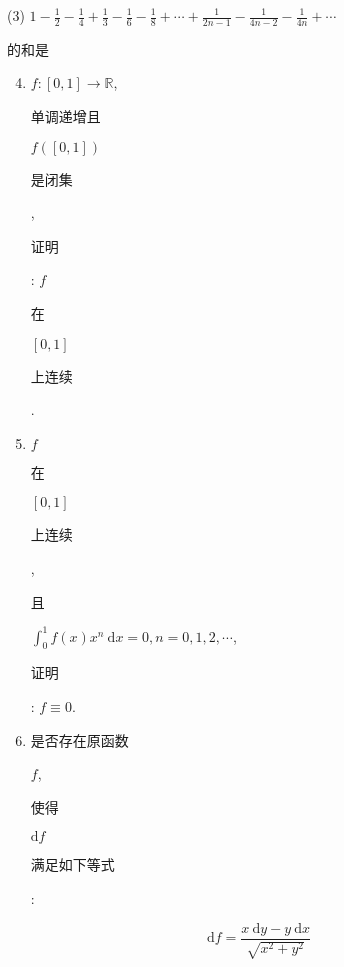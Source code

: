 \documentclass[10pt]{article}
\begin{document}
(3) $1-\frac{1}{2}-\frac{1}{4}+\frac{1}{3}-\frac{1}{6}-\frac{1}{8}+\cdots+\frac{1}{2 n-1}-\frac{1}{4 n-2}-\frac{1}{4 n}+\cdots$ \begin{CJK}{UTF8}{mj}的和是\end{CJK}

\begin{enumerate}
  \setcounter{enumi}{3}
  \item $f:[0,1] \rightarrow \mathbb{R}$, \begin{CJK}{UTF8}{mj}单调递增且\end{CJK} $f([0,1])$ \begin{CJK}{UTF8}{mj}是闭集\end{CJK}, \begin{CJK}{UTF8}{mj}证明\end{CJK}: $f$ \begin{CJK}{UTF8}{mj}在\end{CJK} $[0,1]$ \begin{CJK}{UTF8}{mj}上连续\end{CJK}.

  \item $f$ \begin{CJK}{UTF8}{mj}在\end{CJK} $[0,1]$ \begin{CJK}{UTF8}{mj}上连续\end{CJK}, \begin{CJK}{UTF8}{mj}且\end{CJK} $\int_{0}^{1} f(x) x^{n} \mathrm{~d} x=0, n=0,1,2, \cdots$, \begin{CJK}{UTF8}{mj}证明\end{CJK}: $f \equiv 0$.

  \item \begin{CJK}{UTF8}{mj}是否存在原函数\end{CJK} $f$, \begin{CJK}{UTF8}{mj}使得\end{CJK} $\mathrm{d} f$ \begin{CJK}{UTF8}{mj}满足如下等式\end{CJK}:

\end{enumerate}
$$
\mathrm{d} f=\frac{x \mathrm{~d} y-y \mathrm{~d} x}{\sqrt{x^{2}+y^{2}}}
$$
\end{document}

